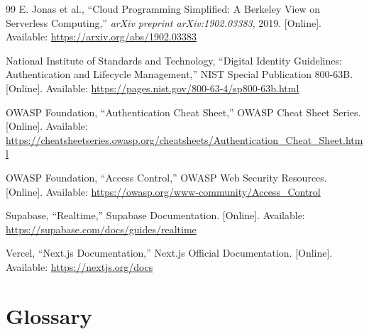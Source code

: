 ﻿\documentclass[12pt,a4paper]{report}
\begin{document}
\begin{thebibliography}{99}
E. Jonas et al., ``Cloud Programming Simplified: A Berkeley View on Serverless Computing,'' \textit{arXiv preprint arXiv:1902.03383}, 2019. [Online]. Available: \url{https://arxiv.org/abs/1902.03383}

National Institute of Standards and Technology, ``Digital Identity Guidelines: Authentication and Lifecycle Management,'' NIST Special Publication 800-63B. [Online]. Available: \url{https://pages.nist.gov/800-63-4/sp800-63b.html}

OWASP Foundation, ``Authentication Cheat Sheet,'' OWASP Cheat Sheet Series. [Online]. Available: \url{https://cheatsheetseries.owasp.org/cheatsheets/Authentication_Cheat_Sheet.html}

OWASP Foundation, ``Access Control,'' OWASP Web Security Resources. [Online]. Available: \url{https://owasp.org/www-community/Access_Control}

Supabase, ``Realtime,'' Supabase Documentation. [Online]. Available: \url{https://supabase.com/docs/guides/realtime}

Vercel, ``Next.js Documentation,'' Next.js Official Documentation. [Online]. Available: \url{https://nextjs.org/docs}

\thispagestyle{empty}
\end{thebibliography}

\clearpage

\newpage

\chapter*{Glossary}
\end{document}
